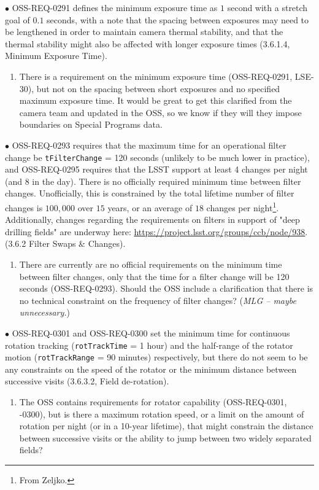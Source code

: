 \documentclass[DM,lsstdraft,toc]{lsstdoc}
\begin{document}
$\bullet$ OSS-REQ-0291 defines the minimum exposure time as $1$ second with a stretch goal of $0.1$ seconds, with a note that the spacing between exposures may need to be lengthened in order to maintain camera thermal stability, and that the thermal stability might also be affected with longer exposure times (3.6.1.4, Minimum Exposure Time). \\
\begin{enumerate}[topsep=-10pt,after=\vspace{10pt},label= \textbf{Concern \Roman*.},resume] \item \label{OSS-5} There is a requirement on the minimum exposure time (OSS-REQ-0291, LSE-30), but not on the spacing between short exposures and no specified maximum exposure time. It would be great to get this clarified from the camera team and updated in the OSS, so we know if they will they impose boundaries on Special Programs data. \end{enumerate}

$\bullet$ OSS-REQ-0293 requires that the maximum time for an operational filter change be {\tt tFilterChange} = 120 seconds (unlikely to be much lower in practice), and OSS-REQ-0295 requires that the LSST support at least 4 changes per night (and 8 in the day). There is no officially required minimum time between filter changes. Unofficially, this is constrained by the total lifetime number of filter changes is $100,000$ over $15$ years, or an average of $18$ changes per night\footnote{From Zeljko.}. Additionally, changes regarding the requirements on filters in support of "deep drilling fields" are underway here: \url{https://project.lsst.org/groups/ccb/node/938}. (3.6.2 Filter Swaps \& Changes).
\begin{enumerate}[topsep=-10pt,after=\vspace{10pt},label= \textbf{Concern \Roman*.},resume] \item \label{OSS-6}   There are currently are no official requirements on the minimum time between filter changes, only that the time for a filter change will be 120 seconds (OSS-REQ-0293). Should the OSS include a clarification that there is no technical constraint on the frequency of filter changes? ({\it MLG -- maybe unnecessary.}) \end{enumerate}

$\bullet$ OSS-REQ-0301 and OSS-REQ-0300 set the minimum time for continuous rotation tracking ({\tt rotTrackTime} = 1 hour) and the half-range of the rotator motion ({\tt rotTrackRange} = 90 minutes) respectively, but there do not seem to be any constraints on the speed of the rotator or the minimum distance between successive visits (3.6.3.2, Field de-rotation). 
\begin{enumerate}[topsep=-10pt,after=\vspace{10pt},label= \textbf{Concern \Roman*.},resume] \item \label{OSS-7} The OSS contains requirements for rotator capability (OSS-REQ-0301, -0300), but is there a maximum rotation speed, or a limit on the amount of rotation per night (or in a 10-year lifetime), that might constrain the distance between successive visits or the ability to jump between two widely separated fields? \end{enumerate}
\end{document}
